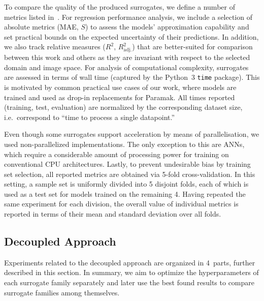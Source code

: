 To compare the quality of the produced surrogates, we define a number of metrics listed
in~. For regression performance analysis, we include a
selection of absolute metrics (MAE, $S$) to assess the models' approximation capability
and set practical bounds on the expected uncertainty of their predictions. In addition, we also track
relative measures ($R^2$, $R^2_\text{adj.}$) that are better-suited for comparison between this work and others as
they are invariant with respect to the selected domain and image space.
For analysis of computational complexity, surrogates are assessed in terms of wall
time (captured by the Python~3 \texttt{time} package). This is motivated by common practical use
cases of our work, where models are trained and used as drop-in replacements for
Paramak. All times reported (training, test, evaluation) are
normalized by the corresponding dataset size, i.e.~correspond to ``time to
process a single datapoint.''

Even though some surrogates support acceleration by means of parallelisation, we
used non-parallelized implementations. The only exception to this are ANNs,
which require a considerable amount of processing power for training on
conventional CPU architectures. Lastly, to prevent undesirable bias by training
set selection, all reported metrics are obtained via 5-fold cross-validation.
In this setting, a sample set is uniformly divided into 5 disjoint folds, each of which
is used as a test set for models trained on the remaining 4. Having repeated the
same experiment for each division, the overall value of individual metrics is
reported in terms of their mean and standard deviation over all folds.



\subsection{Decoupled Approach}\label{sec:experiment-methodology}

Experiments related to the decoupled approach are organized in 4~parts,
further described in this section. In summary, we aim to optimize the hyperparameters of
each surrogate family separately and later use the best found results to compare surrogate
families among themselves.

